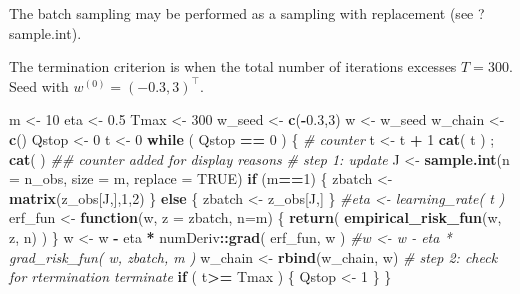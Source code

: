 \documentclass[
]{article}
\newenvironment{Shaded}{\begin{snugshade}}{\end{snugshade}}
\newcommand{\CommentTok}[1]{\textcolor[rgb]{0.56,0.35,0.01}{\textit{#1}}}
\newcommand{\ControlFlowTok}[1]{\textcolor[rgb]{0.13,0.29,0.53}{\textbf{#1}}}
\newcommand{\DataTypeTok}[1]{\textcolor[rgb]{0.13,0.29,0.53}{#1}}
\newcommand{\DecValTok}[1]{\textcolor[rgb]{0.00,0.00,0.81}{#1}}
\newcommand{\FloatTok}[1]{\textcolor[rgb]{0.00,0.00,0.81}{#1}}
\newcommand{\KeywordTok}[1]{\textcolor[rgb]{0.13,0.29,0.53}{\textbf{#1}}}
\newcommand{\NormalTok}[1]{#1}
\newcommand{\OperatorTok}[1]{\textcolor[rgb]{0.81,0.36,0.00}{\textbf{#1}}}
\newcommand{\OtherTok}[1]{\textcolor[rgb]{0.56,0.35,0.01}{#1}}
\newcommand{\StringTok}[1]{\textcolor[rgb]{0.31,0.60,0.02}{#1}}
\begin{document}
The batch sampling may be performed as a sampling with replacement (see
?sample.int).

The termination criterion is when the total number of iterations
excesses \(T=300\). Seed with \(w^{(0)}=(-0.3,3)^\top\).

\begin{Shaded}
\begin{Highlighting}[]
\NormalTok{m \textless{}{-}}\StringTok{ }\DecValTok{10}
\NormalTok{eta \textless{}{-}}\StringTok{ }\FloatTok{0.5}
\NormalTok{Tmax \textless{}{-}}\StringTok{ }\DecValTok{300}
\NormalTok{w\_seed \textless{}{-}}\StringTok{ }\KeywordTok{c}\NormalTok{(}\OperatorTok{{-}}\FloatTok{0.3}\NormalTok{,}\DecValTok{3}\NormalTok{)}
\NormalTok{w \textless{}{-}}\StringTok{ }\NormalTok{w\_seed}
\NormalTok{w\_chain \textless{}{-}}\StringTok{ }\KeywordTok{c}\NormalTok{()}
\NormalTok{Qstop \textless{}{-}}\StringTok{ }\DecValTok{0} 
\NormalTok{t \textless{}{-}}\StringTok{ }\DecValTok{0}
\ControlFlowTok{while}\NormalTok{ ( Qstop }\OperatorTok{==}\StringTok{ }\DecValTok{0}\NormalTok{ ) \{}
  \CommentTok{\# counter}
\NormalTok{  t \textless{}{-}}\StringTok{ }\NormalTok{t }\OperatorTok{+}\StringTok{  }\DecValTok{1}
  \KeywordTok{cat}\NormalTok{( t ) ; }\KeywordTok{cat}\NormalTok{( }\StringTok{\textquotesingle{} \textquotesingle{}}\NormalTok{ ) }\CommentTok{\#\# counter added for display reasons}
  \CommentTok{\# step 1: update  }
\NormalTok{  J \textless{}{-}}\StringTok{ }\KeywordTok{sample.int}\NormalTok{(}\DataTypeTok{n =}\NormalTok{ n\_obs, }\DataTypeTok{size =}\NormalTok{ m, }\DataTypeTok{replace =} \OtherTok{TRUE}\NormalTok{)}
  \ControlFlowTok{if}\NormalTok{ (m}\OperatorTok{==}\DecValTok{1}\NormalTok{) \{}
\NormalTok{    zbatch \textless{}{-}}\StringTok{ }\KeywordTok{matrix}\NormalTok{(z\_obs[J,],}\DecValTok{1}\NormalTok{,}\DecValTok{2}\NormalTok{)}
\NormalTok{  \}}
  \ControlFlowTok{else}\NormalTok{ \{}
\NormalTok{    zbatch \textless{}{-}}\StringTok{ }\NormalTok{z\_obs[J,]}
\NormalTok{  \}}
  \CommentTok{\#eta \textless{}{-} learning\_rate( t )}
\NormalTok{  erf\_fun \textless{}{-}}\StringTok{ }\ControlFlowTok{function}\NormalTok{(w, }\DataTypeTok{z =}\NormalTok{ zbatch, }\DataTypeTok{n=}\NormalTok{m) \{}
    \KeywordTok{return}\NormalTok{( }\KeywordTok{empirical\_risk\_fun}\NormalTok{(w, z, n) ) }
\NormalTok{  \}}
\NormalTok{  w \textless{}{-}}\StringTok{ }\NormalTok{w }\OperatorTok{{-}}\StringTok{ }\NormalTok{eta }\OperatorTok{*}\StringTok{ }\NormalTok{numDeriv}\OperatorTok{::}\KeywordTok{grad}\NormalTok{( erf\_fun, w )}
  \CommentTok{\#w \textless{}{-} w {-} eta * grad\_risk\_fun( w, zbatch, m )}
\NormalTok{  w\_chain \textless{}{-}}\StringTok{ }\KeywordTok{rbind}\NormalTok{(w\_chain, w)}
  \CommentTok{\# step 2: check for rtermination terminate}
  \ControlFlowTok{if}\NormalTok{ ( t}\OperatorTok{\textgreater{}=}\StringTok{ }\NormalTok{Tmax ) \{}
\NormalTok{    Qstop \textless{}{-}}\StringTok{ }\DecValTok{1}
\NormalTok{  \}}
\NormalTok{\}}
\end{Highlighting}
\end{Shaded}
\end{document}
